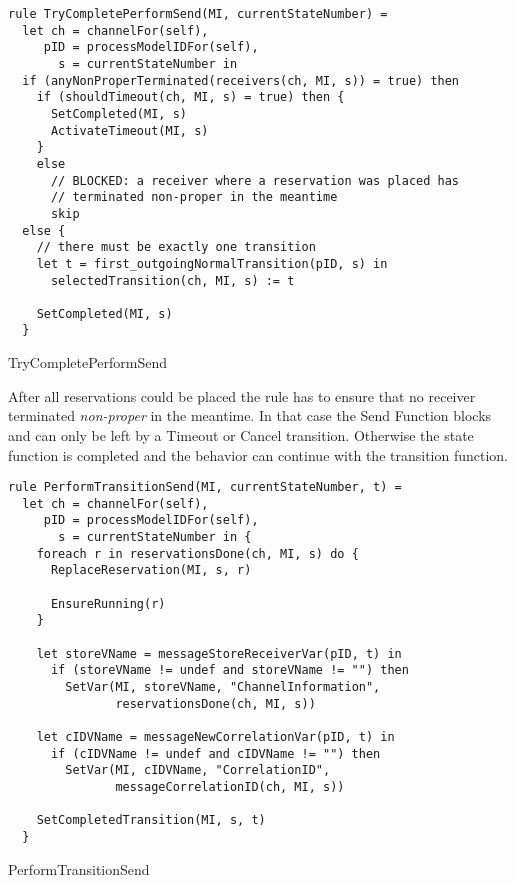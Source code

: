 \begin{listing}[htbp]
\begin{verbatim}
rule TryCompletePerformSend(MI, currentStateNumber) =
  let ch = channelFor(self),
     pID = processModelIDFor(self),
       s = currentStateNumber in
  if (anyNonProperTerminated(receivers(ch, MI, s)) = true) then
    if (shouldTimeout(ch, MI, s) = true) then {
      SetCompleted(MI, s)
      ActivateTimeout(MI, s)
    }
    else
      // BLOCKED: a receiver where a reservation was placed has
      // terminated non-proper in the meantime
      skip
  else {
    // there must be exactly one transition
    let t = first_outgoingNormalTransition(pID, s) in
      selectedTransition(ch, MI, s) := t

    SetCompleted(MI, s)
  }
\end{verbatim}
\caption{TryCompletePerformSend}
\label{lst:shortasm:TryCompletePerformSend}
\end{listing}


After all reservations could be placed the  rule has to ensure that no receiver terminated \textit{non-proper} in the meantime. In that case the Send Function blocks and can only be left by a Timeout or Cancel transition. Otherwise the state function is completed and the behavior can continue with the transition function.


\begin{listing}[htbp]
\begin{verbatim}
rule PerformTransitionSend(MI, currentStateNumber, t) =
  let ch = channelFor(self),
     pID = processModelIDFor(self),
       s = currentStateNumber in {
    foreach r in reservationsDone(ch, MI, s) do {
      ReplaceReservation(MI, s, r)

      EnsureRunning(r)
    }

    let storeVName = messageStoreReceiverVar(pID, t) in
      if (storeVName != undef and storeVName != "") then
        SetVar(MI, storeVName, "ChannelInformation",
               reservationsDone(ch, MI, s))

    let cIDVName = messageNewCorrelationVar(pID, t) in
      if (cIDVName != undef and cIDVName != "") then
        SetVar(MI, cIDVName, "CorrelationID",
               messageCorrelationID(ch, MI, s))

    SetCompletedTransition(MI, s, t)
  }
\end{verbatim}
\caption{PerformTransitionSend}
\label{lst:shortasm:PerformTransitionSend}
\end{listing}



